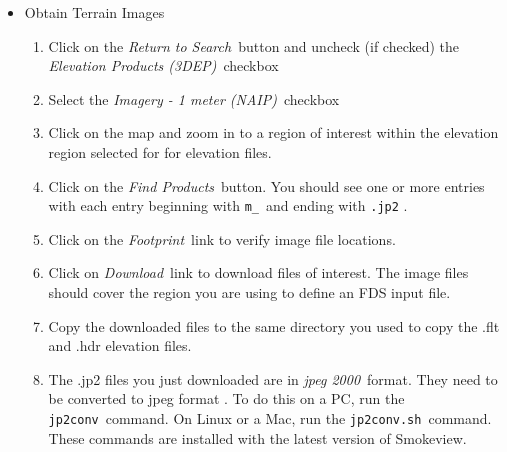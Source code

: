 \begin{itemize}
\begin{itemize}
\item Obtain Terrain Images
\begin{enumerate}
\item Click on the {\em Return to Search}\ button
and uncheck (if checked) the {\em Elevation Products (3DEP)}\ checkbox
\item Select the {\em Imagery - 1 meter (NAIP)}\ checkbox
\item Click on the map and zoom in to
a region of interest within the elevation region selected for for elevation files.
\item Click on the {\em Find Products}\ button.  You should see one or more
entries with each entry beginning with {\tt m\_}\ and ending with {\tt .jp2} .
\item Click on the {\em Footprint}\ link to verify image file locations.
\item Click on {\em Download}\ link to download files of interest. The image files should
cover the region you are using to define an FDS input file.
\item Copy the downloaded files to the same directory you used to copy the .flt and .hdr elevation files.
\item The .jp2 files you just downloaded are in {\em jpeg 2000}\ format.
They need to be converted to jpeg format .
To do this on a PC, run the {\tt jp2conv}\ command.
On Linux or a Mac, run the {\tt jp2conv.sh}\ command.
These commands are installed with the latest version of Smokeview.
\end{enumerate}
\end{itemize}
\end{itemize}

